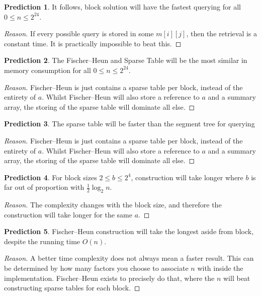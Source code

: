 \documentclass{article}
\theoremstyle{definition}
\newtheorem{prediction}{Prediction}
\begin{document}
\begin{prediction}\label{pred:best}
It follows, block solution will have the fastest querying for all $0 \le n \le 2^{24}$.
\end{prediction}
\begin{proof}[Reason]
If every possible query is stored in some $m[i][j]$, then the retrieval is a constant time.  It is practically impossible to beat this.
\end{proof}

\begin{prediction}\label{pred:best}
The Fischer--Heun and Sparse Table will be the most similar in memory consumption for all $0 \le n \le 2^{24}$.
\end{prediction}
\begin{proof}[Reason]
Fischer--Heun is just contains a sparse table per block, instead of the entirety of $a$.  Whilst Fischer--Heun will also store a reference to $a$ and a summary array, the storing of the sparse table will dominate all else.
\end{proof}

\begin{prediction}\label{pred:best}
The sparse table will be faster than the segment tree for querying
\end{prediction}
\begin{proof}[Reason]
Fischer--Heun is just contains a sparse table per block, instead of the entirety of $a$.  Whilst Fischer--Heun will also store a reference to $a$ and a summary array, the storing of the sparse table will dominate all else.
\end{proof}

\begin{prediction}\label{pred:best}
For block sizes $2 \le b \le 2^4$, construction will take longer where $b$ is far out of proportion with $\frac{1}{2}\log_2{n}$.   
\end{prediction}
\begin{proof}[Reason]
The complexity changes with the block size, and therefore the construction will take longer for the same $a$.
\end{proof}

\begin{prediction}\label{pred:best}
Fischer--Heun construction will take the longest aside from block, despite the running time $O(n)$.
\end{prediction}
\begin{proof}[Reason]
A better time complexity does not always mean a faster result.  This can be determined by how many factors you choose to associate $n$ with inside the implementation.  Fischer--Heun exists to precisely do that, where the $n$ will beat constructing sparse tables for each block.
\end{proof}
\end{document}
